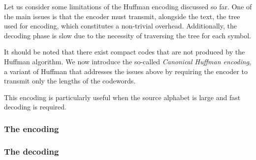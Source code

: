 \documentclass{subfiles}
\begin{document}
    Let us consider some limitations of the Huffman encoding discussed so far.
    One of the main issues 
        is that the encoder must transmit, alongside the text,
        the tree used for encoding, which constitutes a non-trivial overhead.
    Additionally, 
        the decoding phase is slow due to the necessity of traversing the tree for each symbol.

    It should be noted that there exist compact codes
        that are not produced by the Huffman algorithm.
    We now introduce the so-called \emph{Canonical Huffman encoding},
        a variant of Huffman that addresses the issues above by requiring the 
        encoder to transmit only the lengths of the codewords.

    This encoding is particularly useful when the source alphabet is large
        and fast decoding is required.

    \subsubsection{The encoding}
    

    \subsubsection{The decoding}
    
\end{document}
